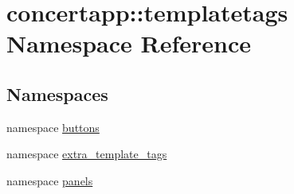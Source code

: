 \hypertarget{namespaceconcertapp_1_1templatetags}{
\section{concertapp::templatetags Namespace Reference}
\label{namespaceconcertapp_1_1templatetags}
}
\subsection*{Namespaces}
\begin{DoxyCompactItemize}
\item 
namespace \hyperlink{namespaceconcertapp_1_1templatetags_1_1buttons}{buttons}
\item 
namespace \hyperlink{namespaceconcertapp_1_1templatetags_1_1extra__template__tags}{extra\_\-template\_\-tags}
\item 
namespace \hyperlink{namespaceconcertapp_1_1templatetags_1_1panels}{panels}
\end{DoxyCompactItemize}
